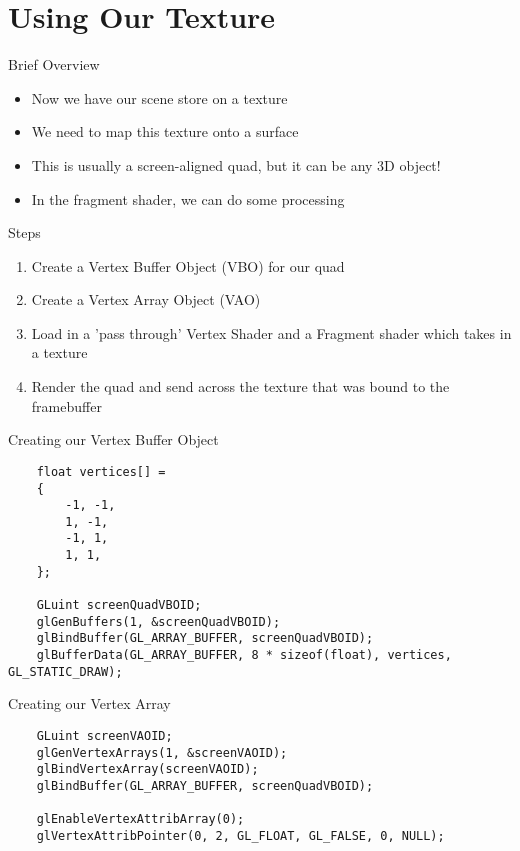 \part{Using Our Texture}
\frame{\partpage}

\begin{frame}{Brief Overview}
	\begin{itemize}
		\item\pause Now we have our scene store on a texture
		\item\pause We need to map this texture onto a surface
		\item\pause This is usually a screen-aligned quad, but it can be any 3D object!
		\item\pause In the fragment shader, we can do some processing
	\end{itemize}
\end{frame}

\begin{frame}{Steps}
	\begin{enumerate}
		\item\pause Create a Vertex Buffer Object (VBO) for our quad
		\item\pause Create a Vertex Array Object (VAO)
		\item\pause Load in a 'pass through' Vertex Shader and a Fragment shader which takes in a texture
		\item\pause Render the quad and send across the texture that was bound to the framebuffer
	\end{enumerate}
\end{frame}

\begin{frame}[fragile]{Creating our Vertex Buffer Object}
	\begin{lstlisting}
	float vertices[] =
	{
		-1, -1,
		1, -1,
		-1, 1,
		1, 1,
	};
	
	GLuint screenQuadVBOID;
	glGenBuffers(1, &screenQuadVBOID);
	glBindBuffer(GL_ARRAY_BUFFER, screenQuadVBOID);
	glBufferData(GL_ARRAY_BUFFER, 8 * sizeof(float), vertices, GL_STATIC_DRAW);
	\end{lstlisting}
\end{frame}

\begin{frame}[fragile]{Creating our Vertex Array}
	\begin{lstlisting}
	GLuint screenVAOID;
	glGenVertexArrays(1, &screenVAOID);
	glBindVertexArray(screenVAOID);
	glBindBuffer(GL_ARRAY_BUFFER, screenQuadVBOID);

	glEnableVertexAttribArray(0);
	glVertexAttribPointer(0, 2, GL_FLOAT, GL_FALSE, 0, NULL);
	\end{lstlisting}
\end{frame}

